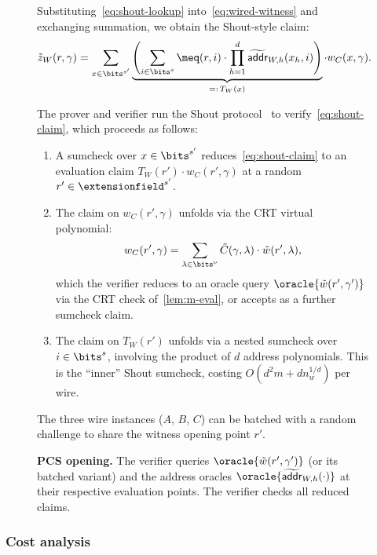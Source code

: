\begin{figure}[H]
\begin{algorithm}[H]
\begin{algorithmic}[1]
    Substituting~\eqref{eq:shout-lookup} into~\eqref{eq:wired-witness} and exchanging summation, we obtain the Shout-style claim:
    \begin{equation}\label{eq:shout-claim}
        \tilde{z}_W(r, \gamma) = \sum_{x \in \bits^{s'}} \underbrace{\left(\sum_{i \in \bits^s} \meq(r, i) \cdot \prod_{h=1}^d \widetilde{\mathsf{addr}}_{W,h}(x_h, i)\right)}_{=: \, T_W(x)} \cdot w_C(x, \gamma).
    \end{equation}

    The prover and verifier run the Shout protocol~\cite[Section 4]{twist-and-shout} to verify~\eqref{eq:shout-claim}, which proceeds as follows:
    \begin{enumerate}
        \item[(a)] A sumcheck over $x \in \bits^{s'}$ reduces~\eqref{eq:shout-claim} to an evaluation claim $T_W(r') \cdot w_C(r', \gamma)$ at a random $r' \in \extensionfield^{s'}$.
        \item[(b)] The claim on $w_C(r', \gamma)$ unfolds via the CRT virtual polynomial:
        \[
            w_C(r', \gamma) = \sum_{\lambda \in \bits^\nu} \tilde{C}(\gamma, \lambda) \cdot \tilde{w}(r', \lambda),
        \]
        which the verifier reduces to an oracle query $\oracle{\tilde{w}(r', \gamma')}$ via the CRT check of~\cref{lem:m-eval}, or accepts as a further sumcheck claim.
        \item[(c)] The claim on $T_W(r')$ unfolds via a nested sumcheck over $i \in \bits^s$, involving the product of $d$ address polynomials. This is the ``inner'' Shout sumcheck, costing $O(d^2 m + d n_w^{1/d})$ per wire.
    \end{enumerate}

    The three wire instances ($A$, $B$, $C$) can be batched with a random challenge to share the witness opening point $r'$.

    \STATE \textbf{PCS opening.} The verifier queries $\oracle{\tilde{w}(r', \gamma')}$ (or its batched variant) and the address oracles $\oracle{\widetilde{\mathsf{addr}}_{W,h}(\cdot)}$ at their respective evaluation points.
    The verifier checks all reduced claims.

\end{algorithmic}
\end{algorithm}
\end{figure}


\subsubsection{Cost analysis}
\label{sec:ring-ss-costs}

